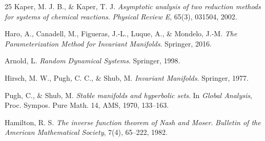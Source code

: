 \documentclass[11pt,a4paper]{article}
\theoremstyle{plain}
\theoremstyle{definition}
\theoremstyle{remark}
\numberwithin{equation}{section}
\numberwithin{figure}{section}
\begin{document}
\begin{thebibliography}{25}
 Kaper, M. J. B., \& Kaper, T. J. \textit{Asymptotic analysis of two reduction methods for systems of chemical reactions}. \textit{Physical Review E}, 65(3), 031504, 2002.

 Haro, A., Canadell, M., Figueras, J.-L., Luque, A., \& Mondelo, J.-M. \textit{The Parameterization Method for Invariant Manifolds}. Springer, 2016.

 Arnold, L. \textit{Random Dynamical Systems}. Springer, 1998.

 Hirsch, M. W., Pugh, C. C., \& Shub, M. \textit{Invariant Manifolds}. Springer, 1977.

 Pugh, C., \& Shub, M. \textit{Stable manifolds and hyperbolic sets}. In \textit{Global Analysis}, Proc. Sympos. Pure Math. 14, AMS, 1970, 133–163.

 Hamilton, R. S. \textit{The inverse function theorem of Nash and Moser}. \textit{Bulletin of the American Mathematical Society}, 7(4), 65–222, 1982.

\end{thebibliography}

\end{document}
